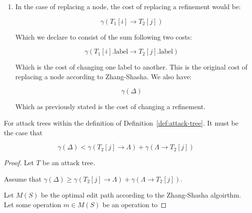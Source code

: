 \begin{definition}
\begin{enumerate}
      \item In the case of replacing a node, the cost of replacing a refinement would be:

$$\gamma({T_1[i]} \rightarrow {T_2[j]})$$

Which we declare to consist of the sum following two costs:

$$\gamma({T_1[i].\text{label}} \rightarrow {T_2[j].\text{label}})$$

Which is the cost of changing one label to another. This is the original cost of replacing a node according to Zhang-Shasha. We also have:

$$\gamma(\Delta)$$

Which as previously stated is the cost of changing a refinement.



\end{enumerate}

\end{definition}


\begin{lemma}
For attack trees within the definition of Definition~\ref{def:attack-tree}. It must be the case that

\[\gamma(\Delta) < \gamma(T_2[j] \rightarrow {\Lambda}) + \gamma(\Lambda \rightarrow {T_2[j]})\]

\begin{proof}
Let $T$ be an attack tree.

Assume that $\gamma(\Delta) \geq \gamma(T_2[j] \rightarrow {\Lambda}) + \gamma(\Lambda \rightarrow {T_2[j]})$.

Let $M(S)$ be the optimal edit path according to the Zhang-Shasha algoirthm. Let some operation $m \in M(S)$ be an operation to
\end{proof}


\end{lemma}






